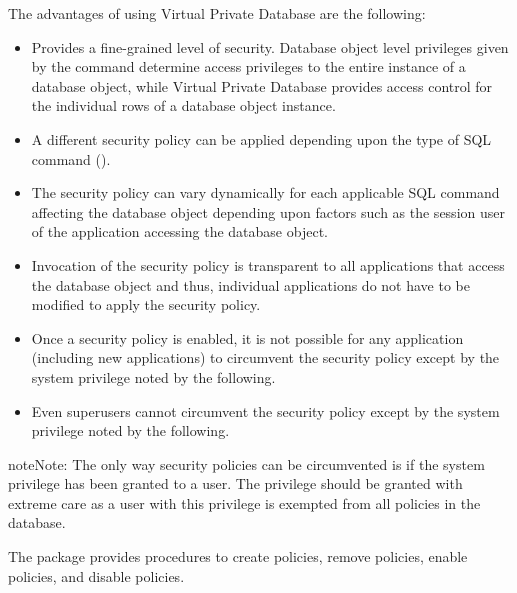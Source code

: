 \documentclass[letterpaper,10pt,english,openany,oneside]{sphinxmanual}
\begin{document}
The advantages of using Virtual Private Database are the following:
\begin{itemize}
\item {} 
Provides a fine-grained level of security. Database object level
privileges given by the  command determine access privileges to
the entire instance of a database object, while Virtual Private
Database provides access control for the individual rows of a
database object instance.

\item {} 
A different security policy can be applied depending upon the type of
SQL command ().

\item {} 
The security policy can vary dynamically for each applicable SQL
command affecting the database object depending upon factors such as
the session user of the application accessing the database object.

\item {} 
Invocation of the security policy is transparent to all applications
that access the database object and thus, individual applications do
not have to be modified to apply the security policy.

\item {} 
Once a security policy is enabled, it is not possible for any
application (including new applications) to circumvent the security
policy except by the system privilege noted by the following.

\item {} 
Even superusers cannot circumvent the security policy except by the
system privilege noted by the following.

\end{itemize}

\begin{sphinxadmonition}{note}{Note:}
The only way security policies can be circumvented is if the  system privilege has been granted to a user. The  privilege should be granted with extreme care as a user with this privilege is exempted from all policies in the database.
\end{sphinxadmonition}

The  package provides procedures to create policies, remove
policies, enable policies, and disable policies.
\end{document}
